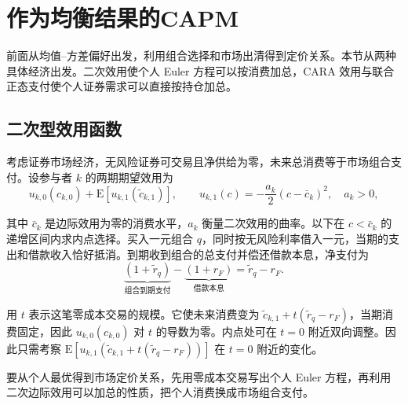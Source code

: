 \begin{center}
\begin{minipage}{\linewidth}
\centering
\renewcommand{\thewjFigure}{\thechapter.S\arabic{wjFigure}}%
%
\par
{}
\end{minipage}
\end{center}

\section{作为均衡结果的CAPM}\label{sec:wj-thirteen-5}
前面从均值--方差偏好出发，利用组合选择和市场出清得到定价关系。本节从两种具体经济出发。二次效用使个人 Euler 方程可以按消费加总，CARA 效用与联合正态支付使个人证券需求可以直接按持仓加总。

\subsection{二次型效用函数}
考虑证券市场经济，无风险证券可交易且净供给为零，未来总消费等于市场组合支付。设参与者 $k$ 的两期期望效用为
\[
 u_{k,0}(c_{k,0})+\mathrm E[u_{k,1}(\widetilde c_{k,1})],
 \qquad u_{k,1}(c)=-\frac{a_k}{2}(c-\bar c_k)^2,\quad a_k>0,
\]

其中 $\bar c_k$ 是边际效用为零的消费水平，$a_k$ 衡量二次效用的曲率。以下在 $c<\bar c_k$ 的递增区间内求内点选择。买入一元组合 $q$，同时按无风险利率借入一元，当期的支出和借款收入恰好抵消。到期收到组合的总支付并偿还借款本息，净支付为
\[
 \underbrace{(1+\widetilde r_q)}_{\text{组合到期支付}}
 -\underbrace{(1+r_F)}_{\text{借款本息}}
 =\widetilde r_q-r_F.
\]

用 $t$ 表示这笔零成本交易的规模。它使未来消费变为 $\widetilde c_{k,1}+t(\widetilde r_q-r_F)$，当期消费固定，因此 $u_{k,0}(c_{k,0})$ 对 $t$ 的导数为零。内点处可在 $t=0$ 附近双向调整。因此只需考察 $\mathrm E[u_{k,1}(\widetilde c_{k,1}+t(\widetilde r_q-r_F))]$ 在 $t=0$ 附近的变化。

要从个人最优得到市场定价关系，先用零成本交易写出个人 Euler 方程，再利用二次边际效用可以加总的性质，把个人消费换成市场组合支付。

